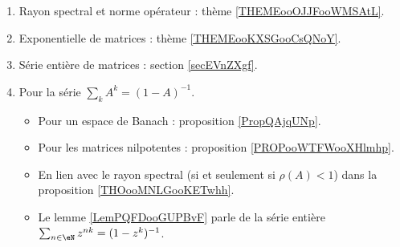        \label{THEMEooPQKDooTAVKFH}

\begin{enumerate}
    \item
        Rayon spectral et norme opérateur : thème \ref{THEMEooOJJFooWMSAtL}.
    \item
        Exponentielle de matrices : thème \ref{THEMEooKXSGooCsQNoY}.
    \item
        Série entière de matrices : section \ref{secEVnZXgf}.
    \item
        Pour la série \( \sum_kA^k=(1-A)^{-1}\).
        \begin{itemize}
            \item Pour un espace de Banach : proposition \ref{PropQAjqUNp}.
            \item Pour les matrices nilpotentes : proposition \ref{PROPooWTFWooXHlmhp}.
            \item En lien avec le rayon spectral (si et seulement si \( \rho(A)<1\)) dans la proposition \ref{THOooMNLGooKETwhh}.
            \item Le lemme \ref{LemPQFDooGUPBvF} parle de la série entière \( \sum_{n\in \eN}z^{nk}=(1-z^k)^{-1}\).
        \end{itemize}
\end{enumerate}

